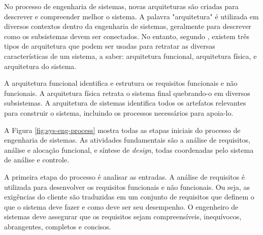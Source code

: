 
    No processo de engenharia de sistemas, novas arquiteturas são criadas para descrever e compreender melhor o sistema. A palavra "arquitetura" é utilizada em diversos contextos dentro da engenharia de sistemas, geralmente para descrever como os subsistemas devem ser conectados. No entanto, segundo , existem três tipos de arquitetura que podem ser usadas para retratar as diversas características de um sistema, a saber: arquitetura funcional, arquitetura física, e arquitetura do sistema. 
    
    A arquitetura funcional identifica e estrutura os requisitos funcionais e não funcionais. A arquitetura física retrata o sistema final quebrando-o em diversos subsistemas. A arquitetura de sistemas identifica todos os artefatos relevantes para construir o sistema, incluindo os processos necessários para apoia-lo.
    
    A Figura \ref{fig:sys-eng-process} mostra todas as etapas iniciais do processo de engenharia de sistemas. As atividades fundamentais são a análise de requisitos, análise e alocação funcional, e síntese de \textit{design}, todas coordenadas pelo sistema de análise e controle.
        
    \begin{figure}[h!]
        \centering
    \end{figure}
    
    A primeira etapa do processo é analisar as entradas. A análise de requisitos é utilizada para desenvolver os requisitos funcionais e não funcionais. Ou seja, as exigências do cliente são traduzidas em um conjunto de requisitos que definem o que o sistema deve fazer e como deve ser seu desempenho. O engenheiro de sistemas deve assegurar que os requisitos sejam compreensíveis, inequívocos, abrangentes, completos e concisos.
    
